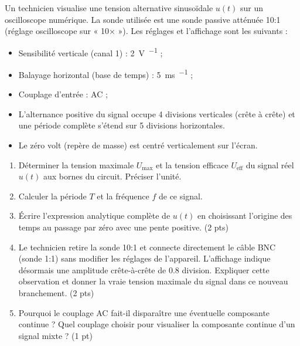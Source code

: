\documentclass[11pt]{article}
\begin{document}
\begin{exercice}
Un technicien visualise une tension alternative sinusoïdale $u(t)$ sur un oscilloscope numérique. La sonde utilisée est une sonde passive atténuée 10:1 (réglage oscilloscope sur « 10× »). Les réglages et l'affichage sont les suivants :
\begin{itemize}
    \item Sensibilité verticale (canal 1) : \SI{2}{\volt\per\division} ;
    \item Balayage horizontal (base de temps) : \SI{5}{\milli\second\per\division} ;
    \item Couplage d'entrée : AC ;
    \item L'alternance positive du signal occupe \num{4} divisions verticales (crête à crête) et une période complète s'étend sur \num{5} divisions horizontales.
    \item Le zéro volt (repère de masse) est centré verticalement sur l'écran.
\end{itemize}
\begin{enumerate}
    \item Déterminer la tension maximale $U_{\text{max}}$ et la tension efficace $U_{\text{eff}}$ du signal réel $u(t)$ aux bornes du circuit. Préciser l'unité.
    \item Calculer la période $T$ et la fréquence $f$ de ce signal.
    \item Écrire l'expression analytique complète de $u(t)$ en choisissant l'origine des temps au passage par zéro avec une pente positive. (2 pts)
    \item Le technicien retire la sonde 10:1 et connecte directement le câble BNC (sonde 1:1) sans modifier les réglages de l'appareil. L'affichage indique désormais une amplitude crête-à-crête de \num{0,8} division. Expliquer cette observation et donner la vraie tension maximale du signal dans ce nouveau branchement. (2 pts)
    \item Pourquoi le couplage AC fait-il disparaître une éventuelle composante continue ? Quel couplage choisir pour visualiser la composante continue d'un signal mixte ? (1 pt)
\end{enumerate}
\end{exercice}
\end{document}
